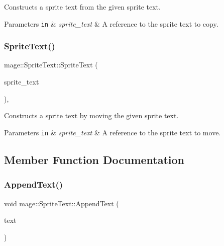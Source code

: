 Constructs a sprite text from the given sprite text.


\begin{DoxyParams}[1]{Parameters}
\mbox{\tt in}  & {\em sprite\+\_\+text} & A reference to the sprite text to copy. \\
\hline
\end{DoxyParams}
\hypertarget{classmage_1_1_sprite_text_ab03ba1fb607ce86d28b742fc020c8a62}{}\label{classmage_1_1_sprite_text_ab03ba1fb607ce86d28b742fc020c8a62} 
\subsubsection{\texorpdfstring{Sprite\+Text()}{SpriteText()}\hspace{0.1cm}{\footnotesize\ttfamily [3/3]}}
{\footnotesize\ttfamily mage\+::\+Sprite\+Text\+::\+Sprite\+Text (\begin{DoxyParamCaption}\item[{\hyperlink{classmage_1_1_sprite_text}{Sprite\+Text} \&\&}]{sprite\+\_\+text }\end{DoxyParamCaption})\hspace{0.3cm}{\ttfamily [protected]}, {\ttfamily [default]}}

Constructs a sprite text by moving the given sprite text.


\begin{DoxyParams}[1]{Parameters}
\mbox{\tt in}  & {\em sprite\+\_\+text} & A reference to the sprite text to move. \\
\hline
\end{DoxyParams}


\subsection{Member Function Documentation}
\hypertarget{classmage_1_1_sprite_text_acf993532a7b2e6ebb761b9b47cbdba98}{}\label{classmage_1_1_sprite_text_acf993532a7b2e6ebb761b9b47cbdba98} 
\subsubsection{\texorpdfstring{Append\+Text()}{AppendText()}\hspace{0.1cm}{\footnotesize\ttfamily [1/3]}}
{\footnotesize\ttfamily void mage\+::\+Sprite\+Text\+::\+Append\+Text (\begin{DoxyParamCaption}\item[{const wstring \&}]{text }\end{DoxyParamCaption})}

